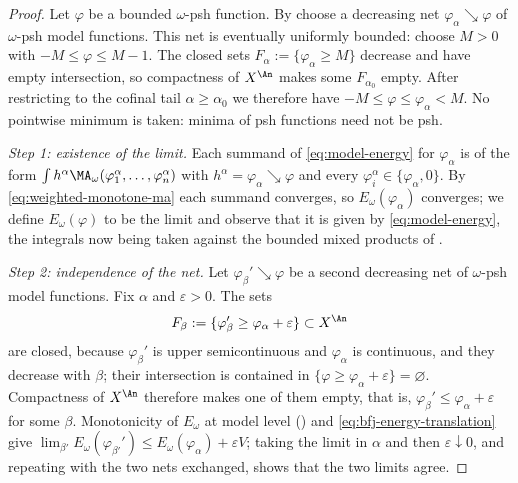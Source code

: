 \begin{proof}
Let $\varphi$ be a bounded $\omega$-psh function.  By
 choose a decreasing net
$\varphi_\alpha\searrow\varphi$ of $\omega$-psh model functions.  This net
is eventually uniformly bounded: choose $M>0$ with
$-M\leq\varphi\leq M-1$.  The closed sets
$F_\alpha:=\{\varphi_\alpha\geq M\}$ decrease and have empty intersection,
so compactness of $X^{\An}$ makes some $F_{\alpha_0}$ empty.  After restricting
to the cofinal tail $\alpha\geq\alpha_0$ we therefore have
$-M\leq\varphi\leq\varphi_\alpha<M$.  No pointwise minimum is taken: minima
of psh functions need not be psh.

\emph{Step 1: existence of the limit.}  Each summand of
\eqref{eq:model-energy} for $\varphi_\alpha$ is of the form
$\int h^\alpha\MA_\omega(\varphi_1^\alpha,\ldots,\varphi_n^\alpha)$ with
$h^\alpha=\varphi_\alpha\searrow\varphi$ and every
$\varphi_i^\alpha\in\{\varphi_\alpha,0\}$.  By
\eqref{eq:weighted-monotone-ma} each summand converges, so
$E_\omega(\varphi_\alpha)$ converges; we define $E_\omega(\varphi)$ to be
the limit and observe that it is given by \eqref{eq:model-energy}, the
integrals now being taken against the bounded mixed products of
.

\emph{Step 2: independence of the net.}  Let $\varphi_\beta'\searrow\varphi$
be a second decreasing net of $\omega$-psh model functions.  Fix
$\alpha$ and $\varepsilon>0$.  The sets
\[
 F_\beta:=\{\varphi_\beta'\geq\varphi_\alpha+\varepsilon\}\subset X^{\An}
\]
are closed, because $\varphi_\beta'$ is upper semicontinuous and
$\varphi_\alpha$ is continuous, and they decrease with $\beta$; their
intersection is contained in
$\{\varphi\geq\varphi_\alpha+\varepsilon\}=\varnothing$.  Compactness of
$X^{\An}$ therefore makes one of them empty, that is,
$\varphi_\beta'\leq\varphi_\alpha+\varepsilon$ for some $\beta$.
Monotonicity of $E_\omega$ at model level
() and
\eqref{eq:bfj-energy-translation} give
$\lim_{\beta'}E_\omega(\varphi_{\beta'}')\leq
E_\omega(\varphi_\alpha)+\varepsilon V$; taking the limit in $\alpha$ and
then $\varepsilon\downarrow0$, and repeating with the two nets exchanged,
shows that the two limits agree.


\end{proof}
